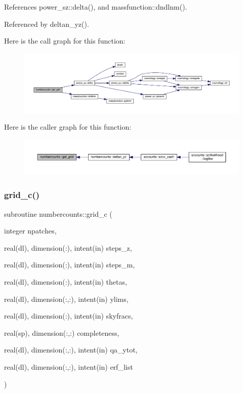 References power\+\_\+sz\+::delta(), and massfunction\+::dndlnm().



Referenced by deltan\+\_\+yz().

Here is the call graph for this function\+:
\nopagebreak
\begin{figure}[H]
\begin{center}
\leavevmode
\includegraphics[width=350pt]{namespacenumbercounts_a530ce747969dd91d2b57a90d658dbb62_cgraph}
\end{center}
\end{figure}
Here is the caller graph for this function\+:
\nopagebreak
\begin{figure}[H]
\begin{center}
\leavevmode
\includegraphics[width=350pt]{namespacenumbercounts_a530ce747969dd91d2b57a90d658dbb62_icgraph}
\end{center}
\end{figure}
\mbox{\label{namespacenumbercounts_ab87ce14039efd094615930acc710e6b2}} 
\subsubsection{\texorpdfstring{grid\+\_\+c()}{grid\_c()}}
{\footnotesize\ttfamily subroutine numbercounts\+::grid\+\_\+c (\begin{DoxyParamCaption}\item[{integer}]{npatches,  }\item[{real(dl), dimension(\+:), intent(in)}]{steps\+\_\+z,  }\item[{real(dl), dimension(\+:), intent(in)}]{steps\+\_\+m,  }\item[{real(dl), dimension(\+:), intent(in)}]{thetas,  }\item[{real(dl), dimension(\+:,\+:), intent(in)}]{ylims,  }\item[{real(dl), dimension(\+:), intent(in)}]{skyfracs,  }\item[{real(sp), dimension(\+:,\+:)}]{completeness,  }\item[{real(dl), dimension(\+:,\+:), intent(in)}]{qa\+\_\+ytot,  }\item[{real(dl), dimension(\+:,\+:), intent(in)}]{erf\+\_\+list }\end{DoxyParamCaption})}



